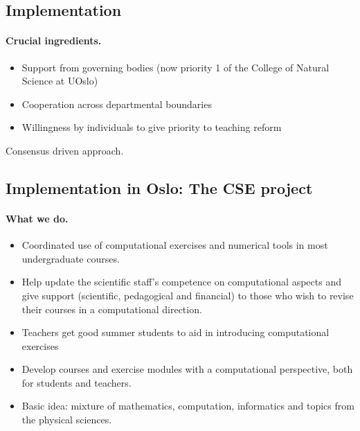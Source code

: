 \documentclass[%
twoside,                 %
final,                   %
10pt]{article}
\begin{document}
\subsection{Implementation}

\paragraph{Crucial ingredients.}

\begin{itemize}
\item Support from governing bodies (now priority 1 of the College of Natural Science at UOslo)

\item Cooperation across departmental boundaries

\item Willingness by individuals to give priority to teaching reform
\end{itemize}

\noindent
Consensus driven approach.





\subsection{Implementation in Oslo: The CSE  project}

\paragraph{What we do.}
\begin{itemize}
\item Coordinated use of computational exercises and numerical tools in most undergraduate courses.

\item Help update the scientific staff's competence on computational aspects and give support (scientific, pedagogical and financial)  to those who wish to revise  their courses in a computational direction.

\item Teachers get good summer students to aid in introducing computational exercises

\item Develop courses and exercise modules with a computational perspective, both for students and teachers. 

\item Basic idea: mixture of mathematics, computation, informatics and topics from the physical sciences.
\end{itemize}
\end{document}

